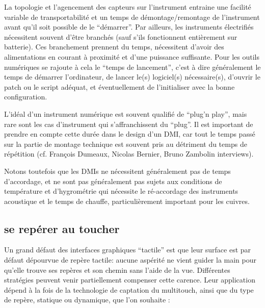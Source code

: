 La topologie et l'agencement des capteurs sur l'instrument entraine une facilité variable de transportabilité et un temps de démontage/remontage de l'instrument avant qu'il soit possible de le ``démarrer''.
Par ailleurs, les instruments électrifiés nécessitent souvent d'être branchés (sauf s'ils fonctionnent entièrement sur batterie). Ces branchement prennent du temps, nécessitent d'avoir des alimentations en courant à proximité et d'une puissance suffisante. Pour les outils numériques se rajoute à cela le ``temps de lancement'', c'est à dire généralement le temps de démarrer l'ordinateur, de lancer le(s) logiciel(s) nécessaire(s), d'ouvrir le patch ou le script adéquat, et éventuellement de l'initialiser avec la bonne configuration.

L'idéal d'un instrument numérique est souvent qualifié de ``plug'n play'', mais rare sont les cas d'instrument qui s'affranchissent du ``plug''. Il est important de prendre en compte cette durée dans le design d'un \gls{DMI}, car tout le temps passé sur la partie de montage technique est souvent pris au détriment du temps de répétition (cf. François Dumeaux, Nicolas Bernier, Bruno Zambolin interviews). 

Notons toutefois que les \glspl{DMI} ne nécessitent généralement pas de temps d'accordage, et ne sont pas généralement pas sujets aux conditions de température et d'hygrométrie qui nécessite le ré-accordage des instruments acoustique et le temps de chauffe, particulièrement important pour les cuivres.


\subsection{se repérer au toucher}
Un grand défaut des interfaces graphiques ``tactile'' est que leur surface est par défaut dépourvue de repère tactile: aucune aspérité ne vient guider la main pour qu'elle trouve ses repères et son chemin sans l'aide de la vue. Différentes stratégies peuvent venir partiellement compenser cette carence. Leur application dépend à la fois de la technologie de captation du multitouch, ainsi que du type de repère, statique ou dynamique, que l'on souhaite :

